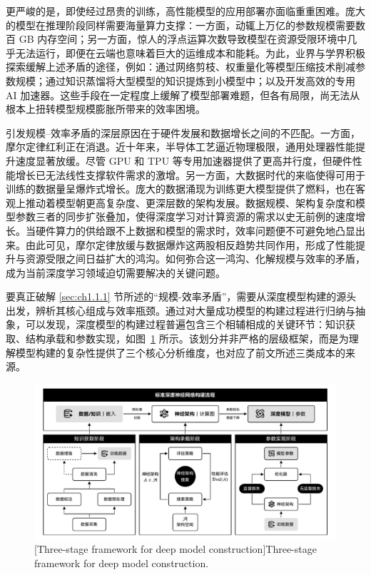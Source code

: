 \documentclass[../main.tex]{subfiles}
\begin{document}
更严峻的是，即使经过昂贵的训练，高性能模型的应用部署亦面临重重困难。庞大的模型在推理阶段同样需要海量算力支撑：一方面，动辄上万亿的参数规模需要数百 GB 内存空间；另一方面，惊人的浮点运算次数导致模型在资源受限环境中几乎无法运行，即便在云端也意味着巨大的运维成本和能耗。为此，业界与学界积极探索缓解上述矛盾的途径，例如：通过网络剪枝、权重量化等模型压缩技术削减参数规模\cite{deepcompressioncompressing_han_2016,quantizationtrainingneural_jacob_2018}；通过知识蒸馏将大型模型的知识提炼到小模型中\cite{distillingknowledgeneural_hinton_2015}；以及开发高效的专用 AI 加速器\cite{datacenterperformanceanalysis_jouppi_2017}。这些手段在一定程度上缓解了模型部署难题，但各有局限，尚无法从根本上扭转模型规模膨胀所带来的效率困境。

引发规模–效率矛盾的深层原因在于硬件发展和数据增长之间的不匹配。一方面，摩尔定律红利正在消退\cite{chipsaremoores_waldrop_2016}。近十年来，半导体工艺逼近物理极限，通用处理器性能提升速度显著放缓。尽管 GPU 和 TPU 等专用加速器提供了更高并行度，但硬件性能增长已无法线性支撑软件需求的激增。另一方面，大数据时代的来临使得可用于训练的数据量呈爆炸式增长。庞大的数据涌现为训练更大模型提供了燃料，也在客观上推动着模型朝更高复杂度、更深层数的架构发展。数据规模、架构复杂度和模型参数三者的同步扩张叠加，使得深度学习对计算资源的需求以史无前例的速度增长。当硬件算力的供给跟不上数据和模型的需求时，效率问题便不可避免地凸显出来。由此可见，摩尔定律放缓与数据爆炸这两股相反趋势共同作用，形成了性能提升与资源受限之间日益扩大的鸿沟。如何弥合这一鸿沟、化解规模与效率的矛盾，成为当前深度学习领域迫切需要解决的关键问题。

\label{sec:Ch1-deep-model-construction-machanisam}

要真正破解 \ref{sec:ch1.1.1} 节所述的“规模-效率矛盾”，需要从深度模型构建的源头出发，辨析其核心组成与效率瓶颈。通过对大量成功模型的构建过程进行归纳与抽象，可以发现，深度模型的构建过程普遍包含三个相辅相成的关键环节：知识获取、结构承载和参数实现，如图~\ref{fig:three_stage_of_training} 所示。该划分并非严格的层级框架，而是为理解模型构建的复杂性提供了三个核心分析维度，也对应了前文所述三类成本的来源。

\begin{figure}
	\centering
	\includegraphics[width=\textwidth]{Ch1-1_three_stage_of_training.pdf}
	[Three-stage framework for deep model construction]{Three-stage framework for deep model construction.}
	\label{fig:three_stage_of_training}
\end{figure}
\end{document}
